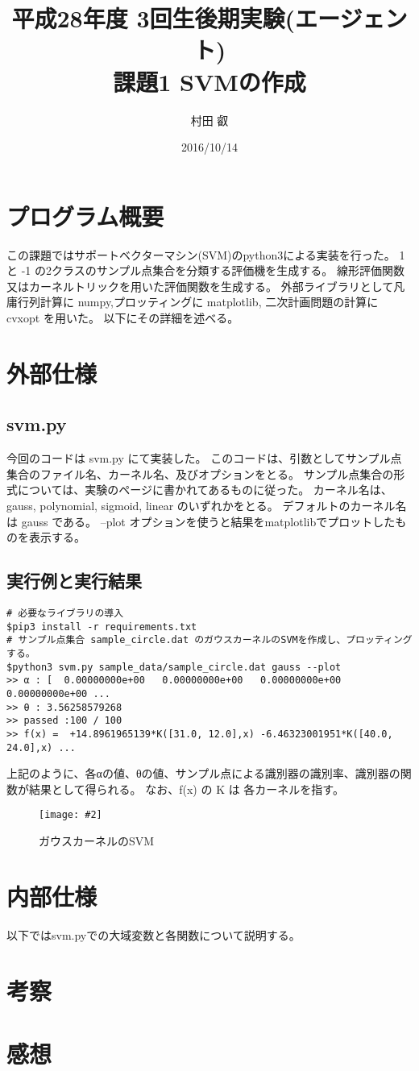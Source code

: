 \documentclass[]{jsarticle}
\newcommand*{\graphc}[3][7.0cm]{\begin{figure}[h] \begin{center}\texttt{[image: \#2]}\caption{#3}\end{center}\end{figure}}
\begin{document}
\title{平成28年度 3回生後期実験(エージェント) \\ 課題1 SVMの作成 }
\author{村田 叡}
\date{ 2016/10/14 }
\maketitle

\section{プログラム概要}
この課題ではサポートベクターマシン(SVM)のpython3による実装を行った。
1 と -1 の2クラスのサンプル点集合を分類する評価機を生成する。
線形評価関数又はカーネルトリックを用いた評価関数を生成する。
外部ライブラリとして凡庸行列計算に numpy,プロッティングに matplotlib,
二次計画問題の計算に cvxopt を用いた。
以下にその詳細を述べる。



\section{外部仕様}
\subsection{svm.py}
今回のコードは svm.py にて実装した。
このコードは、引数としてサンプル点集合のファイル名、カーネル名、及びオプションをとる。
サンプル点集合の形式については、実験のページに書かれてあるものに従った。
カーネル名は、gauss, polynomial, sigmoid, linear のいずれかをとる。
デフォルトのカーネル名は gauss である。
--plot オプションを使うと結果をmatplotlibでプロットしたものを表示する。
\subsection{実行例と実行結果}
\begin{verbatim}
# 必要なライブラリの導入
$pip3 install -r requirements.txt
# サンプル点集合 sample_circle.dat のガウスカーネルのSVMを作成し、プロッティングする。
$python3 svm.py sample_data/sample_circle.dat gauss --plot
>> α : [  0.00000000e+00   0.00000000e+00   0.00000000e+00   0.00000000e+00 ...
>> θ : 3.56258579268
>> passed :100 / 100
>> f(x) =  +14.8961965139*K([31.0, 12.0],x) -6.46323001951*K([40.0, 24.0],x) ...
\end{verbatim}
上記のように、各αの値、θの値、サンプル点による識別器の識別率、識別器の関数が結果として得られる。
なお、f(x) の K は 各カーネルを指す。
\graphc[16cm]{./images/circleplot.png}{ガウスカーネルのSVM}


\section{内部仕様}
以下ではsvm.pyでの大域変数と各関数について説明する。


\section{考察}

\section{感想}
\end{document}
